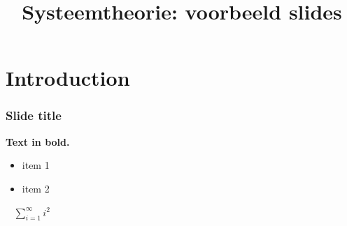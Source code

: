 \documentclass{beamer}
\title{Systeemtheorie: voorbeeld slides}
\begin{document}
\begin{frame}
\titlepage
\end{frame}


\section{Introduction}

\begin{frame}
\frametitle{Slide title}
\textbf{Text in bold.} \\
\begin{itemize}
\item item 1
\item item 2
\end{itemize}
\pause
\ \newline
$\sum_{i=1}^\infty i^2$
\end{frame}

\end{document}
